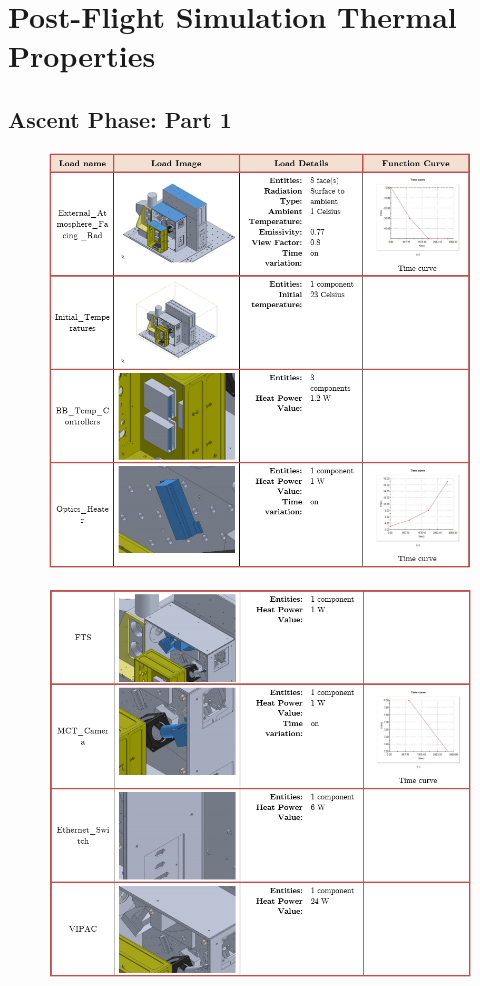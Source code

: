 \chapter{Post-Flight Simulation Thermal Properties}\label{post_flight_thermal_properties_appendix}

\section{Ascent Phase: Part 1}

\begin{figure}[h!]
    \centering
    \includegraphics[width=\textwidth]{thermal_load_images/ascent_pt1_TL_images/ascesnt_pt1_1.PNG}
\end{figure}

\begin{figure}
    \centering
    \includegraphics[width=\textwidth]{thermal_load_images/ascent_pt1_TL_images/ascesnt_pt1_2.png}
\end{figure}

